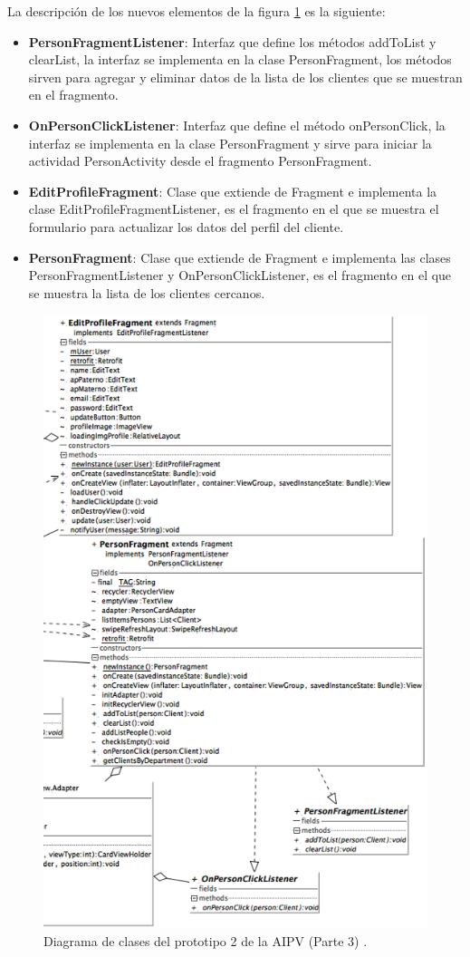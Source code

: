 La descripción de los nuevos elementos de la figura \ref{clases-AIPV2-parte3} es la siguiente: 

\begin{itemize}
\item \textbf{PersonFragmentListener}: Interfaz que define los métodos addToList y clearList, la interfaz se implementa en la clase PersonFragment, los métodos sirven para agregar y eliminar datos de la lista de los clientes que se muestran en el fragmento.
\item \textbf{OnPersonClickListener}: Interfaz que define el método onPersonClick, la interfaz se implementa en la clase PersonFragment y sirve para iniciar la actividad PersonActivity desde el fragmento PersonFragment.
\item \textbf{EditProfileFragment}: Clase que extiende de Fragment e implementa la clase EditProfileFragmentListener, es el fragmento en el que se muestra el formulario para actualizar los datos del perfil del cliente.
\item \textbf{PersonFragment}: Clase que extiende de Fragment e implementa las clases PersonFragmentListener y OnPersonClickListener, es el fragmento en el que se muestra la lista de los clientes cercanos.
\end{itemize}

\FloatBarrier
\begin{figure}[htbp!]
		\centering
			\includegraphics[width=.8 \textwidth]{imagenes/adrian/vendedor/prototipo2/clases_3}
		\caption{Diagrama de clases del prototipo 2 de la AIPV (Parte 3) .}
		\label{clases-AIPV2-parte3}
\end{figure}
\FloatBarrier


